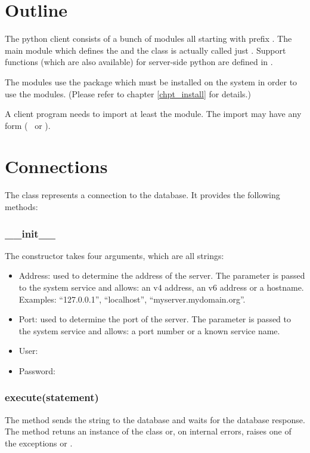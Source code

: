 \section{Outline}
The python client consists of a bunch
of modules all starting with prefix .
The main module which defines
the  and the  class
is actually called just .
Support functions (which are also available)
for server-side python are defined in
.

The modules use the package 
which must be installed on the system in order
to use the  modules.
(Please refer to chapter
\ref{chpt_install} for details.)

A client program needs to import at least
the  module. The import may have
any form (\ie\  or
).

\section{Connections}
The  class represents
a  connection to the
database. It provides the following 
methods:
\subsubsection{\_\_init\_\_}
The constructor takes four arguments,
which are all strings:
\begin{itemize}
\item Address:
used to determine the address of the server.
The parameter is passed to the system service
 and allows:
an v4 address,
an v6 address or
a hostname.
Examples: ``127.0.0.1'', ``localhost'',
``myserver.mydomain.org''.

\item Port:
used to determine the port of the server.
The parameter is passed to the system service
 and allows:
a port number or a known service name.

\item User:
\item Password:
\end{itemize}

\subsubsection{execute(statement)}
The method sends the string  to the database
and waits for the database response.
The method retuns an instance of the  class
or, on internal errors, raises one of the exceptions
 or .

